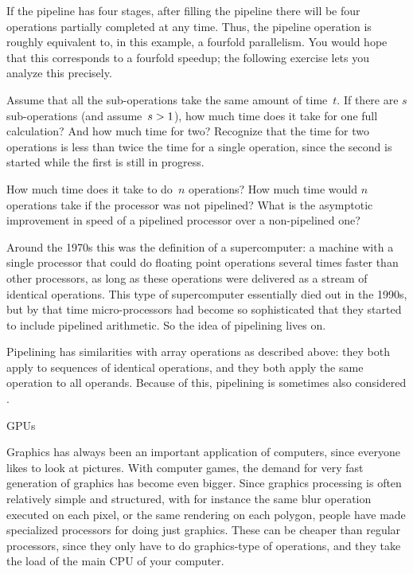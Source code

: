 If the pipeline has four stages, after filling the pipeline there will
be four operations partially completed at any time. Thus, the pipeline
operation is roughly equivalent to, in this example, a fourfold
parallelism. You would hope that this corresponds to a fourfold speedup; 
the following exercise lets you analyze this precisely.
\begin{exercise}
  Assume that all the sub-operations take the same amount of
  time~$t$. If there are $s$ sub-operations (and
  assume~$s>\nobreak1$), how much time does it take for one full
  calculation? And how much time for two? Recognize that the time
  for two operations is less than twice the time for a single operation,
  since the second is started while the first is still in progress.

  How much time does it take to do~$n$ operations? How much
  time would $n$ operations take if the processor was not pipelined?
  What is the asymptotic improvement in speed of a pipelined processor
  over a non-pipelined one?
\end{exercise}

Around the 1970s this was the definition of a supercomputer: a machine
with a single processor that could do floating point operations
several times faster than other processors, as long as these
operations were delivered as a stream of identical operations. This
type of supercomputer essentially died out in the 1990s, but by that
time micro-processors had become so sophisticated that they started to
include pipelined arithmetic. So the idea of pipelining lives on.

Pipelining has similarities with array operations as described above:
they both apply to sequences of identical operations, and they both
apply the same operation to all operands. Because of this, pipelining
is sometimes also considered .

 {GPUs}
\label{sec:gpu}

Graphics has always been an important application of computers, since
everyone likes to look at pictures. With computer games, the demand
for very fast generation of graphics has become even bigger. 
Since graphics processing is often relatively simple and structured, with 
for instance the same
blur operation executed on each pixel, or the same rendering on each polygon,
people have made specialized processors for doing just graphics. These can be
cheaper than regular processors, since they only have to do graphics-type
of operations, and they take the load of the main CPU of your computer.

